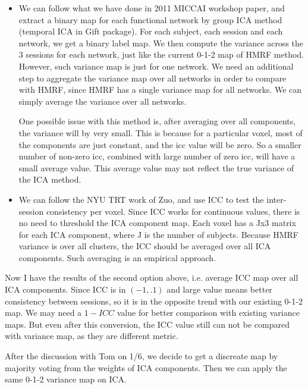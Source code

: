 \documentclass[12pt]{article}
\begin{document}
\begin{itemize}
  \item We can follow what we have done in 2011 MICCAI workshop paper, and
    extract a binary map for each functional network by group ICA method
    (temporal ICA in Gift package). For each subject, each session and each
    network, we get a binary label map. We then compute the variance across the
    3 sessions for each network, just like the current 0-1-2 map of HMRF
    method. However, such variance map is just for one network. We need an
    additional step to aggregate the variance map over all networks in order to
    compare with HMRF, since HMRF has a single variance map for all networks. We
    can simply average the variance over all networks.

    One possible issue with this method is, after averaging over all components,
    the variance will by very small. This is because for a particular voxel,
    most of the components are just constant, and the icc value will be zero. So
    a smaller number of non-zero icc, combined with large number of zero icc,
    will have a small average value. This average value may not reflect the true
    variance of the ICA method.

    \item We can follow the NYU TRT work of Zuo, and use ICC to test the
      inter-session consistency per voxel. Since ICC works for continuous
      values, there is no need to threshold the ICA component map. Each voxel
      has a Jx3 matrix for each ICA component, where J is the number of
      subjects. Because HMRF variance is over all clusters, the ICC should be
      averaged over all ICA components. Such averaging is an empirical approach.
\end{itemize}

Now I have the results of the second option above, i.e. average ICC map over all
ICA components. Since ICC is in $(-1,. 1)$ and large value means better
consistency between sessions, so it is in the opposite trend with our existing
0-1-2 map. We may need a $1 - ICC$ value for better comparison with existing
variance maps. But even after this conversion, the ICC value still can not be
compared with variance map, as they are different metric. 

After the discussion with Tom on 1/6, we decide to get a discreate map by
majority voting from the weights of ICA components. Then we can apply the same
0-1-2 variance map on ICA.
\end{document}
